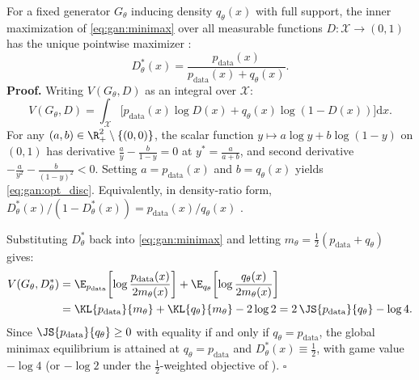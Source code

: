 \documentclass[../../../../master.tex]{subfiles}
\begin{document}
\begin{coremath}
For a fixed generator $G_\theta$ inducing density $q_\theta(x)$ with full support, the inner maximization of \eqref{eq:gan:minimax} over all measurable functions $D : \mathcal{X} \to (0,1)$ has the unique pointwise maximizer  :
\begin{equation}
  \label{eq:gan:opt_disc}
  D^*_\theta(x) = \frac{p_{\mathrm{data}}(x)}{p_{\mathrm{data}}(x) + q_\theta(x)}.
\end{equation}
\textbf{Proof.} Writing $V(G_\theta, D)$ as an integral over $\mathcal{X}$:
\[
  V(G_\theta, D) = \int_{\mathcal{X}} \Big[ p_{\mathrm{data}}(x)\log D(x) + q_\theta(x)\log(1 - D(x)) \Big] \mathrm{d}x.
\]
For any $(a, b) \in \R_+^2 \setminus \{(0,0)\}$, the scalar function $y \mapsto a\log y + b\log(1-y)$ on $(0,1)$ has derivative $\frac{a}{y} - \frac{b}{1-y} = 0$ at $y^* = \frac{a}{a+b}$, and second derivative $-\frac{a}{y^2} - \frac{b}{(1-y)^2} < 0$. Setting $a = p_{\mathrm{data}}(x)$ and $b = q_\theta(x)$ yields \eqref{eq:gan:opt_disc}. Equivalently, in density-ratio form, $D^*_\theta(x)/(1 - D^*_\theta(x)) = p_{\mathrm{data}}(x)/q_\theta(x)$ .

Substituting $D^*_\theta$ back into \eqref{eq:gan:minimax} and letting $m_\theta = \frac{1}{2}(p_{\mathrm{data}} + q_\theta)$ gives:
\begin{align}
  V(G_\theta, D^*_\theta)
  &= \E_{p_{\mathrm{data}}}\!\left[\log \frac{p_{\mathrm{data}}(x)}{2m_\theta(x)}\right]
   + \E_{q_\theta}\!\left[\log \frac{q_\theta(x)}{2m_\theta(x)}\right] \nonumber \\
  &= \KL{p_{\mathrm{data}}}{m_\theta} + \KL{q_\theta}{m_\theta} - 2\log 2
   = 2\,\JS{p_{\mathrm{data}}}{q_\theta} - \log 4. \label{eq:gan:jsd_eq}
\end{align}
Since $\JS{p_{\mathrm{data}}}{q_\theta} \ge 0$ with equality if and only if $q_\theta = p_{\mathrm{data}}$, the global minimax equilibrium is attained at $q_\theta = p_{\mathrm{data}}$ and $D^*_\theta(x) \equiv \frac{1}{2}$, with game value $-\log 4$ (or $-\log 2$ under the $\frac{1}{2}$-weighted objective of ). \hfill $\square$
\end{coremath}
\end{document}
